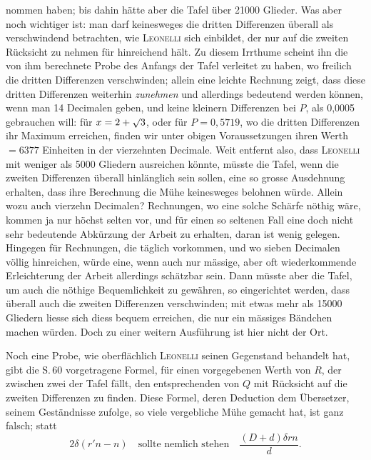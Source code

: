 nommen haben; bis dahin hätte aber die Tafel über 21000 Glieder. Was aber noch wichtiger ist: man darf keinesweges die dritten Differenzen überall als verschwindend betrachten, wie \textsc{Leonelli} sich einbildet, der nur auf die zweiten Rücksicht zu nehmen für hinreichend hält. Zu diesem Irrthume scheint ihn die von ihm berechnete Probe des Anfangs der Tafel verleitet zu haben, wo freilich die dritten Differenzen verschwinden; allein eine leichte Rechnung zeigt, dass diese dritten Differenzen weiterhin \emph{zunehmen} und allerdings bedeutend werden können, wenn man 14 Decimalen geben, und keine kleinern Differenzen bei $P$, als 0,0005 gebrauchen will: für $x = 2+\mathord{\surd}3$, oder für $P = 0,5719$, wo die dritten Differenzen ihr Maximum erreichen, finden wir unter obigen Voraussetzungen ihren Werth $= 6377$ Einheiten in der vierzehnten Decimale. Weit entfernt also, dass \textsc{Leonelli} mit weniger als 5000 Gliedern ausreichen könnte, müsste die Tafel, wenn die zweiten Differenzen überall hinlänglich sein sollen, eine so grosse Ausdehnung erhalten, dass ihre Berechnung die Mühe keinesweges belohnen würde. Allein wozu auch vierzehn Decimalen? Rechnungen, wo eine solche Schärfe nöthig wäre, kommen ja nur höchst selten vor, und für einen so seltenen Fall eine doch nicht sehr bedeutende Abkürzung der Arbeit zu erhalten, daran ist wenig gelegen. Hingegen für Rechnungen, die täglich vorkommen, und wo sieben Decimalen völlig hinreichen, würde eine, wenn auch nur mässige, aber oft wiederkommende Erleichterung der Arbeit allerdings schätzbar sein. Dann müsste aber die Tafel, um auch die nöthige Bequemlichkeit zu gewähren, so eingerichtet werden, dass überall auch die zweiten Differenzen verschwinden; mit etwas mehr als 15000 Gliedern liesse sich diess bequem erreichen, die nur ein mässiges Bändchen machen würden. Doch zu einer weitern Ausführung ist hier nicht der Ort.

Noch eine Probe, wie oberflächlich \textsc{Leonelli} seinen Gegenstand behandelt hat, gibt die S.\,60 vorgetragene Formel, für einen vorgegebenen Werth von $R$, der zwischen zwei der Tafel fällt, den entsprechenden von $Q$ mit Rücksicht auf die zweiten Differenzen zu finden. Diese Formel, deren Deduction dem Übersetzer, seinem Geständnisse zufolge, so viele vergebliche Mühe gemacht hat, ist ganz falsch; statt
\[
2\delta(r'n - n) \quad \text{sollte nemlich stehen} \quad \frac{(D+d)\delta rn}{d}.
\]
